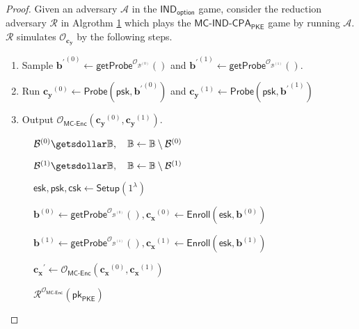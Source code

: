 \begin{proof}

Given an adversary $\mathcal{A}$ in the $\textsf{IND}_{\textsf{option}}$ game, consider the reduction adversary $\mathcal{R}$ in Algrothm \ref{red:mc-ind-cpa:ind-esk-psk-ox-oc} which plays the $\textsf{MC-IND-CPA}_{\textsf{PKE}}$ game by running $\mathcal{A}$. $\mathcal{R}$ simulates $\mathcal{O}_{\mathbf{c_y}}$ by the following steps.

\begin{enumerate}
	\item Sample ${\mathbf{b}^{\prime}}^{(0)} \gets \textsf{getProbe}^{\mathcal{O}_{\mathcal{B}^{(0)}}}()$ and ${\mathbf{b}^{\prime}}^{(1)} \gets \textsf{getProbe}^{\mathcal{O}_{\mathcal{B}^{(1)}}}()$.
	\item Run $\mathbf{c_y}^{(0)} \gets \textsf{Probe}(\textsf{psk}, {\mathbf{b}^{\prime}}^{(0)} )$ and $\mathbf{c_y}^{(1)} \gets \textsf{Probe}(\textsf{psk}, {\mathbf{b}^{\prime}}^{(1)} )$
	\item Output $\mathcal{O}_{\textsf{MC-Enc}}(\mathbf{c_y}^{(0)}, \mathbf{c_y}^{(1)})$.
\end{enumerate}

\begin{figure}[h]
\centering
	
	\begin{minipage}[t]{0.7\linewidth}
	\centering
	\begin{algorithm}[H]
	\caption{$\mathcal{R}^{\mathcal{O}_{\textsf{MC-Enc}}}(\textsf{pk}_{\textsf{PKE}})$}
	\label{red:mc-ind-cpa:ind-esk-psk-ox-oc}
	\begin{algorithmic}[1]
		\State $\mathcal{B}^{(0)} \getsdollar \mathbb{B}, \quad \mathbb{B} \gets \mathbb{B} \setminus \mathcal{B}^{(0)}$
		
		\State $\mathcal{B}^{(1)} \getsdollar \mathbb{B}, \quad \mathbb{B} \gets \mathbb{B} \setminus \mathcal{B}^{(1)}$

		\State $\textsf{esk}, \textsf{psk}, \textsf{csk} \gets \textsf{Setup}(1^\lambda)$

		\State $\mathbf{b}^{(0)} \gets \textsf{getProbe}^{\mathcal{O}_{\mathcal{B}^{(0)}}}(), \mathbf{c_x}^{(0)} \gets \textsf{Enroll}(\textsf{esk}, \mathbf{b}^{(0)})$
		
		\State $\mathbf{b}^{(1)} \gets \textsf{getProbe}^{\mathcal{O}_{\mathcal{B}^{(1)}}}(), \mathbf{c_x}^{(1)} \gets \textsf{Enroll}(\textsf{esk}, \mathbf{b}^{(1)})$
		
		\State $\mathbf{c_x}^\prime \gets \mathcal{O}_{\textsf{MC-Enc}}(\mathbf{c_x}^{(0)}, \mathbf{c_x}^{(1)})$


\end{algorithmic}
\end{algorithm}
\end{minipage}
\end{figure}
\end{proof}
